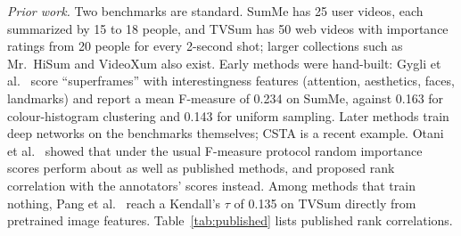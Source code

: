 \documentclass[conference]{IEEEtran}
\begin{document}
\emph{Prior work.} Two benchmarks are standard. SumMe \cite{gygli2014summe} has 25 user videos, each summarized by 15 to 18 people, and TVSum \cite{song2015tvsum} has 50 web videos with importance ratings from 20 people for every 2-second shot; larger collections such as Mr.~HiSum \cite{sul2023mrhisum} and VideoXum \cite{lin2023videoxum} also exist. Early methods were hand-built: Gygli et al.\ \cite{gygli2014summe} score ``superframes'' with interestingness features (attention, aesthetics, faces, landmarks) and report a mean F-measure of 0.234 on SumMe, against 0.163 for colour-histogram clustering and 0.143 for uniform sampling. Later methods train deep networks on the benchmarks themselves; CSTA \cite{son2024csta} is a recent example. Otani et al.\ \cite{otani2019rethinking} showed that under the usual F-measure protocol random importance scores perform about as well as published methods, and proposed rank correlation with the annotators' scores instead. Among methods that train nothing, Pang et al.\ \cite{pang2024zeroshot} reach a Kendall's $\tau$ of 0.135 on TVSum directly from pretrained image features. Table~\ref{tab:published} lists published rank correlations.
\end{document}
